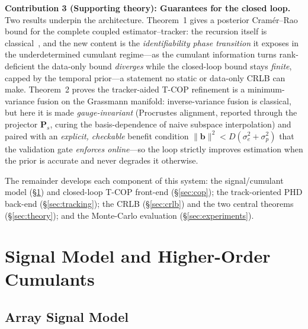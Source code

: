 \documentclass[journal]{IEEEtran}
\newcommand{\mat}[1]{\mathbf{#1}}
\begin{document}
\textbf{Contribution 3 (Supporting theory): Guarantees for the closed loop.}
Two results underpin the architecture. Theorem~1 gives a posterior Cram\'{e}r--Rao bound for the complete coupled estimator--tracker: the recursion itself is classical~\cite{tichavsky1998posterior}, and the new content is the \emph{identifiability phase transition} it exposes in the underdetermined cumulant regime---as the cumulant information turns rank-deficient the data-only bound \emph{diverges} while the closed-loop bound stays \emph{finite}, capped by the temporal prior---a statement no static or data-only CRLB can make. Theorem~2 proves the tracker-aided T-COP refinement is a minimum-variance fusion on the Grassmann manifold: inverse-variance fusion is classical, but here it is made \emph{gauge-invariant} (Procrustes alignment, reported through the projector $\mat{P}_s$, curing the basis-dependence of naive subspace interpolation) and paired with an \emph{explicit, checkable} benefit condition $\|\mat{b}\|^2<D(\sigma_e^2+\sigma_p^2)$ that the validation gate \emph{enforces online}---so the loop strictly improves estimation when the prior is accurate and never degrades it otherwise.

The remainder develops each component of this system: the signal/cumulant model (\S\ref{sec:signal_model}) and closed-loop T-COP front-end (\S\ref{sec:cop}); the track-oriented PHD back-end (\S\ref{sec:tracking}); the CRLB (\S\ref{sec:crlb}) and the two central theorems (\S\ref{sec:theory}); and the Monte-Carlo evaluation (\S\ref{sec:experiments}).

\section{Signal Model and Higher-Order Cumulants}
\label{sec:signal_model}

\subsection{Array Signal Model}
\end{document}
